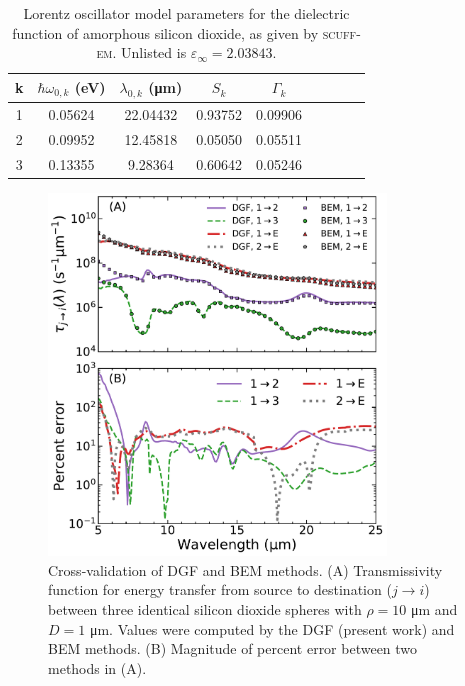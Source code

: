 \begin{table}
	\caption{\label{tab:DielectricFunction}Lorentz oscillator model parameters for the dielectric function of amorphous silicon dioxide, as given by \textsc{scuff-em}. Unlisted is $\varepsilon_{\infty}=2.03843$.}
	\begin{center}
		\renewcommand{\arraystretch}{1.15}
		\setlength{\tabcolsep}{0.10cm}
		\begin{tabular}{ccccccccc}
			\hline 
			\multicolumn{1}{c}{k} &
			\multicolumn{1}{c}{$\hbar \omega_{0,k}$ (eV)} & 
			\multicolumn{1}{c}{$\lambda_{0,k}$ (\si{\micro\meter})} & 
			\multicolumn{1}{c}{$S_{k}$} &
			\multicolumn{1}{c}{$\Gamma_{k}$} \\
			\hline
			1 & 0.05624 & 22.04432 & 0.93752 & 0.09906\\ 
			2 & 0.09952 & 12.45818& 0.05050 & 0.05511 \\
			3 & 0.13355 & 9.28364 & 0.60642 & 0.05246 \\
			\hline
		\end{tabular} 
	\end{center}
\end{table}

\begin{figure}
\centering
\includegraphics[width=0.8\textwidth]{./Figures/Figure2.pdf}
\caption{\label{fig:ThreeSpheres_SCUFFEM}Cross-validation of DGF and BEM methods. (A) Transmissivity function for energy transfer from source to destination ($j \rightarrow i$) between three identical silicon dioxide spheres with $\rho=10$ \si{\micro\meter} and $D = 1$ \si{\micro\meter}. Values were computed by the DGF (present work) and BEM methods. (B) Magnitude of percent error between two methods in (A).}
\end{figure}

